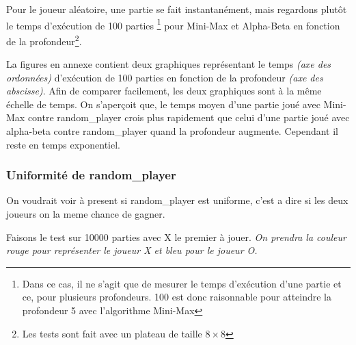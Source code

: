 \documentclass{report}
\begin{document}
Pour le joueur aléatoire, une partie se fait instantanément, mais regardons plutôt le temps d'exécution de 100 parties \footnote{Dans ce cas, il ne s'agit que de mesurer le temps d'exécution d'une partie et ce, pour plusieurs profondeurs. 100 est donc raisonnable pour atteindre la profondeur 5 avec l'algorithme Mini-Max} pour Mini-Max et Alpha-Beta en fonction de la profondeur\footnote{Les tests sont fait avec un plateau de taille $8\times8$}.\newline


La figures en annexe contient deux graphiques représentant le temps \textit{(axe des ordonnées)} d'exécution de 100 parties en fonction de la profondeur \textit{(axe des abscisse)}. Afin de comparer facilement, les deux graphiques sont à la même échelle de temps. On s'aperçoit que, le temps moyen d'une partie joué avec Mini-Max contre random\_player crois plus rapidement que celui d'une partie joué avec alpha-beta contre random\_player quand la profondeur augmente. Cependant il reste en temps exponentiel.


\subsubsection{Uniformité de random\_player}

On voudrait voir à present si random\_player est uniforme, c'est a dire si les deux joueurs on la meme chance de gagner. \newline


Faisons le test sur 10000 parties avec X le premier à jouer.
\textit{On prendra la couleur rouge pour représenter le joueur X et bleu pour le joueur O.}\newline
\newline

\begin{center}


\end{center}
\end{document}
